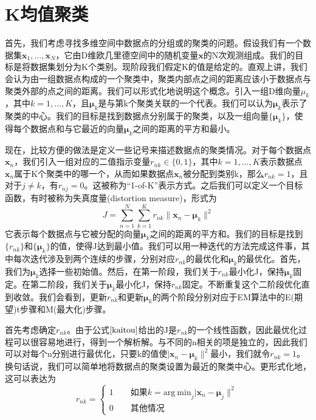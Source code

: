 \section{K均值聚类}
首先，我们考虑寻找多维空间中数据点的分组或的聚类的问题。假设我们有一个数据集$\boldsymbol{x}_1,\dots,\boldsymbol{x}_N$，它由D维欧几里德空间中的随机变量$\boldsymbol{x}$的N次观测组成。我们的目标是将数据集划分为K个类别。现阶段我们假定K的值是给定的。直观上讲，我们会认为由一组数据点构成的一个聚类中，聚类内部点之间的距离应该小于数据点与聚类外部的点之间的距离。我们可以形式化地说明这个概念。引入一组D维向量$\mu_k$，其中$k=1,\dots,K$，且$\boldsymbol{\mu}_k$是与第k个聚类关联的一个代表。我们可以认为$\boldsymbol{\mu}_k$表示了聚类的中心。我们的目标是找到数据点分别属于的聚类，以及一组向量$\{\boldsymbol{\mu}_k \}$，使得每个数据点和与它最近的向量$\boldsymbol{\mu}_k$之间的距离的平方和最小。

现在，比较方便的做法是定义一些记号来描述数据点的聚类情况。对于每个数据点$\boldsymbol{x}_n$，我们引入一组对应的二值指示变量$r_{nk}\in      \{0,1\}$，其中$k=1,\dots,K$表示数据点$\boldsymbol{x}_n$属于K个聚类中的哪一个，从而如果数据点$\boldsymbol{x}_n$被分配到类别k，那么$r_{nk}=1$，且对于$j\ne k$，有$r_{nj}=0$。这被称为“1-of-K”表示方式。之后我们可以定义一个目标函数，有时被称为失真度量(distortion measure)，形式为
\begin{equation}
\label{kaitou}
	J=\sum_{n=1}^{N}\sum_{k=1}^{K}r_{nk}\lVert \boldsymbol{x}_n-\boldsymbol{\mu}_k\rVert^2
\end{equation}
它表示每个数据点与它被分配的向量$\boldsymbol{\mu}_k$之间的距离的平方和。我们的目标是找到$\{r_{nk} \}$和$\{\boldsymbol{\mu}_k \}$的值，使得J达到最小值。我们可以用一种迭代的方法完成这件事，其中每次迭代涉及到两个连续的步骤，分别对应$r_{nk}$的最优化和$\boldsymbol{\mu}_k$的最优化。首先，我们为$\boldsymbol{\mu}_k$选择一些初始值。然后，在第一阶段，我们关于$r_{nk}$最小化J，保持$\boldsymbol{\mu}_k$固定。在第二阶段，我们关于$\boldsymbol{\mu}_k$最小化J，保持$r_{nk}$固定。不断重复这个二阶段优化直到收敛。我们会看到，更新$r_{nk}$和更新$\boldsymbol{\mu}_k$的两个阶段分别对应于EM算法中的E(期望)t步骤和M(最大化)步骤。

首先考虑确定$r_{nk}$。由于公式$\ref{kaitou}$给出的J是$r_{nk}$的一个线性函数，因此最优化过程可以很容易地进行，得到一个解析解。与不同的n相关的项是独立的，因此我们可以对每个n分别进行最优化，只要k的值使$\lvert \boldsymbol{x}_n-\boldsymbol{\mu}_k\rVert^2$最小，我们就令$r_{nk}=1$。换句话说，我们可以简单地将数据点的聚类设置为最近的聚类中心。更形式化地，这可以表达为
\begin{equation}
	r_{nk}=\begin{cases}
	1\qquad \text{如果}k=\mathrm{arg\ min}_j\lvert \boldsymbol{x}_n-\boldsymbol{\mu}_j\rVert^2\\
	0\qquad \text{其他情况}
	\end{cases}
\end{equation}


